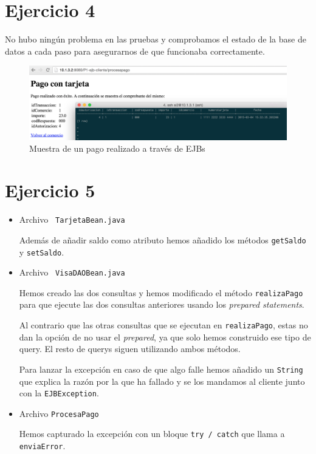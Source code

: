 \documentclass[a4paper, 10pt]{article}
\begin{document}
 \section{Ejercicio 4}

	 No hubo ningún problema en las pruebas y comprobamos el estado de la base de datos a cada paso para asegurarnos de que funcionaba correctamente.

	 \begin{figure}[hbtp]
	 	\centering
	 	\includegraphics[width=1.1\textwidth]{pantallazos/ejercicio4.png}
	 	\caption{Muestra de un pago realizado a través de EJBs}
	 \end{figure}



 \section{Ejercicio 5}
	 \begin{itemize}
	 	\item Archivo \texttt{ TarjetaBean.java}
	 	
	 	
	 	 Además de añadir saldo como atributo hemos añadido los métodos \texttt{getSaldo} y \texttt{setSaldo}.
	 	 
	 	 
	 	 \item Archivo \texttt{ VisaDAOBean.java}
	 	 
	 	 
	 	 Hemos creado las dos consultas y hemos modificado el método \texttt{realizaPago} para que ejecute las dos consultas anteriores usando los \textit{prepared statements}.
	 	 
	 	 Al contrario que las otras consultas que se ejecutan en \texttt{realizaPago}, estas no dan la opción de no usar el \textit{prepared}, ya que solo hemos construido ese tipo de query. El resto de querys siguen utilizando ambos métodos.
	 	  	 
	 	 Para lanzar la excepción en caso de que algo falle hemos añadido un \texttt{String} que explica la razón por la que ha fallado y se los mandamos al cliente junto con la \texttt{EJBException}.
	 	 
	 	 \item Archivo \texttt{ProcesaPago}
	 	 
	 	 Hemos capturado la excepción con un bloque \texttt{try / catch} que llama a \texttt{enviaError}.
	 \end{itemize}
 
\end{document}
